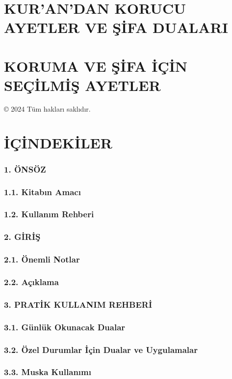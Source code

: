 \documentclass[12pt,a4paper]{article}
\begin{document}
\section{KUR'AN'DAN KORUCU AYETLER VE ŞİFA DUALARI}

\section{KORUMA VE ŞİFA İÇİN SEÇİLMİŞ AYETLER}

© 2024 Tüm hakları saklıdır.

\section{İÇİNDEKİLER}

\subsubsection{1. ÖNSÖZ}
\subsubsection{1.1. Kitabın Amacı}
\subsubsection{1.2. Kullanım Rehberi}
\subsubsection{2. GİRİŞ}
\subsubsection{2.1. Önemli Notlar}
\subsubsection{2.2. Açıklama}
\subsubsection{3. PRATİK KULLANIM REHBERİ}
\subsubsection{3.1. Günlük Okunacak Dualar}
\subsubsection{3.2. Özel Durumlar İçin Dualar ve Uygulamalar}
\subsubsection{3.3. Muska Kullanımı}
\end{document}
